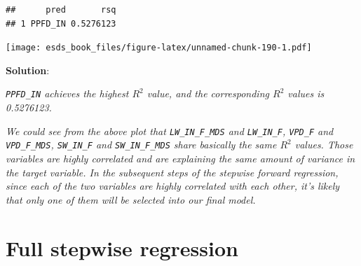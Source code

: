 \documentclass[
]{book}
\newenvironment{Shaded}{\begin{snugshade}}{\end{snugshade}}
\newcommand{\CommentTok}[1]{\textcolor[rgb]{0.56,0.35,0.01}{\textit{#1}}}
\newcommand{\DataTypeTok}[1]{\textcolor[rgb]{0.13,0.29,0.53}{#1}}
\newcommand{\DecValTok}[1]{\textcolor[rgb]{0.00,0.00,0.81}{#1}}
\newcommand{\KeywordTok}[1]{\textcolor[rgb]{0.13,0.29,0.53}{\textbf{#1}}}
\newcommand{\NormalTok}[1]{#1}
\newcommand{\OperatorTok}[1]{\textcolor[rgb]{0.81,0.36,0.00}{\textbf{#1}}}
\newcommand{\StringTok}[1]{\textcolor[rgb]{0.31,0.60,0.02}{#1}}
\begin{document}
\begin{verbatim}
##      pred       rsq
## 1 PPFD_IN 0.5276123
\end{verbatim}

\begin{Shaded}
\end{Shaded}

\texttt{[image: esds\_book\_files/figure-latex/unnamed-chunk-190-1.pdf]}

\textbf{Solution}:

\emph{\texttt{PPFD\_IN} achieves the highest \(R^2\) value, and the corresponding \(R^2\) values is 0.5276123.}

\emph{We could see from the above plot that \texttt{LW\_IN\_F\_MDS} and \texttt{LW\_IN\_F}, \texttt{VPD\_F} and \texttt{VPD\_F\_MDS}, \texttt{SW\_IN\_F} and \texttt{SW\_IN\_F\_MDS} share basically the same \(R^2\) values. Those variables are highly correlated and are explaining the same amount of variance in the target variable. In the subsequent steps of the stepwise forward regression, since each of the two variables are highly correlated with each other, it's likely that only one of them will be selected into our final model.}

\hypertarget{full-stepwise-regression}{%
\section{Full stepwise regression}\label{full-stepwise-regression}}
\end{document}
